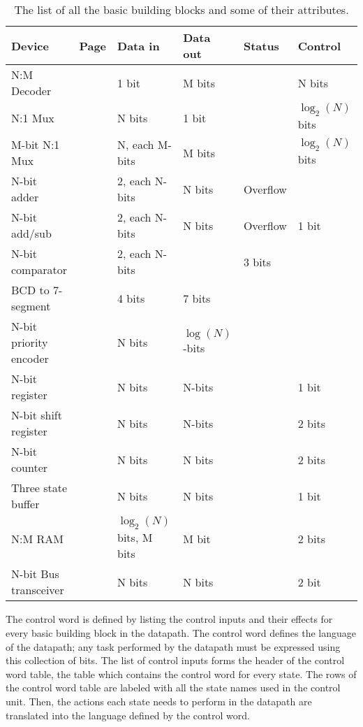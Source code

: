 \begin{table}
{\small
\begin{tabular}{|l|l|l|l|l|l|} \hline
Device      & Page & Data in     & Data out & Status   & Control \\ \hline
N:M Decoder & \pageref{page:dec}          & 1 bit       & M bits  & 	& N bits  \\ \hline
N:1 Mux     & \pageref{page:mux}          & N bits  & 1 bit    & 	&  $\log_2(N)$ bits  \\ \hline
M-bit N:1 Mux   & \pageref{page:wmu}          & N, each M-bits  & M bits & 	&  $\log_2(N)$ bits  \\ \hline
N-bit adder & \pageref{page:add}          & 2, each N-bits & N bits & Overflow &   \\ \hline
N-bit add/sub & \pageref{page:as}         & 2, each N-bits & N bits & Overflow & 1 bit  \\ \hline
N-bit comparator & \pageref{page:com}     & 2, each N-bits &  & 3 bits &   \\ \hline
BCD to 7-segment & \pageref{page:7seg}  & 4 bits & 7 bits & &   \\ \hline
N-bit priority encoder & \pageref{page:prior}  & N bits & $\log(N)$-bits & &   \\ \hline
N-bit register & \pageref{page:reg}       & N bits & N-bits &  & 1 bit  \\ \hline
N-bit shift register & \pageref{page:shi} & N bits & N-bits &  & 2 bits  \\ \hline
N-bit counter & \pageref{page:counter}        & N bits & N bits &  & 2 bits  \\ \hline
Three state buffer& \pageref{page:tsb}      & N bits & N bits & & 1 bit  \\ \hline
N:M RAM & \pageref{page:ram}              & $\log_2(N)$ bits, M bits & M bit & & 2 bits  \\ \hline
N-bit Bus transceiver & \pageref{page:bus}      & N bits & N bits & & 2 bit  \\ \hline
\end{tabular}
}
\caption{The list of all the basic building blocks and some of their attributes.}
\label{table:bbblist}
\end{table}
\label{page:boxlist}

The control word is defined by listing the control inputs and their effects
for every basic building block in the datapath.  The control word defines 
the language of the datapath; any task performed by the datapath must
be expressed using this collection of bits.  The list of control inputs
forms the header of the control word table, the table which 
contains the control word for every state.  The rows of the control word 
table are labeled with all the state names used in the control unit.  Then,
the actions each state needs to perform in the datapath are translated 
into the language defined by the control word.  

